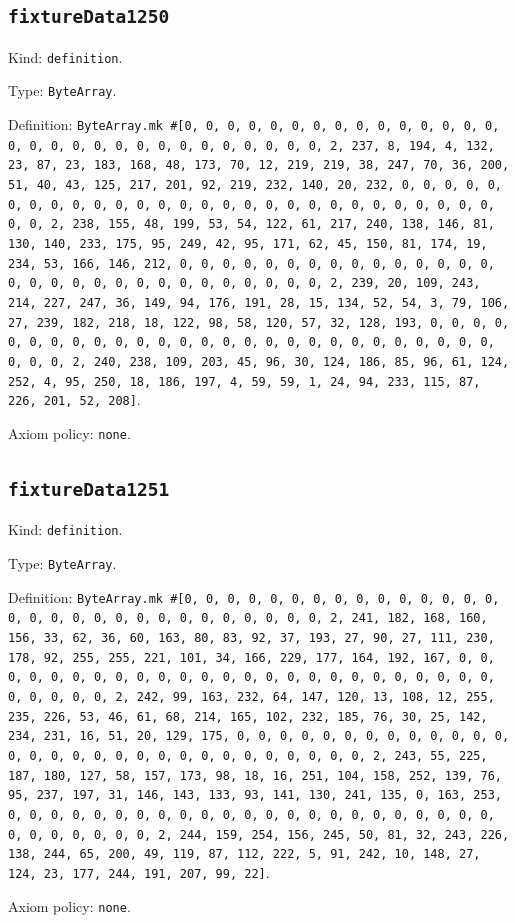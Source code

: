 \documentclass[11pt]{article}
\begin{document}
\subsection*{\texttt{fixtureData1250}}
\noindent Kind: \texttt{definition}.\par
\noindent Type: \texttt{ByteArray}.\par
\noindent Definition: \texttt{ByteArray.mk \#[0, 0, 0, 0, 0, 0, 0, 0, 0, 0, 0, 0, 0, 0, 0, 0, 0, 0, 0, 0, 0, 0, 0, 0, 0, 0, 0, 0, 0, 0, 2, 237, 8, 194, 4, 132, 23, 87, 23, 183, 168, 48, 173, 70, 12, 219, 219, 38, 247, 70, 36, 200, 51, 40, 43, 125, 217, 201, 92, 219, 232, 140, 20, 232, 0, 0, 0, 0, 0, 0, 0, 0, 0, 0, 0, 0, 0, 0, 0, 0, 0, 0, 0, 0, 0, 0, 0, 0, 0, 0, 0, 0, 0, 0, 2, 238, 155, 48, 199, 53, 54, 122, 61, 217, 240, 138, 146, 81, 130, 140, 233, 175, 95, 249, 42, 95, 171, 62, 45, 150, 81, 174, 19, 234, 53, 166, 146, 212, 0, 0, 0, 0, 0, 0, 0, 0, 0, 0, 0, 0, 0, 0, 0, 0, 0, 0, 0, 0, 0, 0, 0, 0, 0, 0, 0, 0, 0, 0, 2, 239, 20, 109, 243, 214, 227, 247, 36, 149, 94, 176, 191, 28, 15, 134, 52, 54, 3, 79, 106, 27, 239, 182, 218, 18, 122, 98, 58, 120, 57, 32, 128, 193, 0, 0, 0, 0, 0, 0, 0, 0, 0, 0, 0, 0, 0, 0, 0, 0, 0, 0, 0, 0, 0, 0, 0, 0, 0, 0, 0, 0, 0, 0, 2, 240, 238, 109, 203, 45, 96, 30, 124, 186, 85, 96, 61, 124, 252, 4, 95, 250, 18, 186, 197, 4, 59, 59, 1, 24, 94, 233, 115, 87, 226, 201, 52, 208]}.\par
\noindent Axiom policy: \texttt{none}.\par
\subsection*{\texttt{fixtureData1251}}
\noindent Kind: \texttt{definition}.\par
\noindent Type: \texttt{ByteArray}.\par
\noindent Definition: \texttt{ByteArray.mk \#[0, 0, 0, 0, 0, 0, 0, 0, 0, 0, 0, 0, 0, 0, 0, 0, 0, 0, 0, 0, 0, 0, 0, 0, 0, 0, 0, 0, 0, 0, 2, 241, 182, 168, 160, 156, 33, 62, 36, 60, 163, 80, 83, 92, 37, 193, 27, 90, 27, 111, 230, 178, 92, 255, 255, 221, 101, 34, 166, 229, 177, 164, 192, 167, 0, 0, 0, 0, 0, 0, 0, 0, 0, 0, 0, 0, 0, 0, 0, 0, 0, 0, 0, 0, 0, 0, 0, 0, 0, 0, 0, 0, 0, 0, 2, 242, 99, 163, 232, 64, 147, 120, 13, 108, 12, 255, 235, 226, 53, 46, 61, 68, 214, 165, 102, 232, 185, 76, 30, 25, 142, 234, 231, 16, 51, 20, 129, 175, 0, 0, 0, 0, 0, 0, 0, 0, 0, 0, 0, 0, 0, 0, 0, 0, 0, 0, 0, 0, 0, 0, 0, 0, 0, 0, 0, 0, 0, 0, 2, 243, 55, 225, 187, 180, 127, 58, 157, 173, 98, 18, 16, 251, 104, 158, 252, 139, 76, 95, 237, 197, 31, 146, 143, 133, 93, 141, 130, 241, 135, 0, 163, 253, 0, 0, 0, 0, 0, 0, 0, 0, 0, 0, 0, 0, 0, 0, 0, 0, 0, 0, 0, 0, 0, 0, 0, 0, 0, 0, 0, 0, 0, 0, 2, 244, 159, 254, 156, 245, 50, 81, 32, 243, 226, 138, 244, 65, 200, 49, 119, 87, 112, 222, 5, 91, 242, 10, 148, 27, 124, 23, 177, 244, 191, 207, 99, 22]}.\par
\noindent Axiom policy: \texttt{none}.\par
\end{document}
